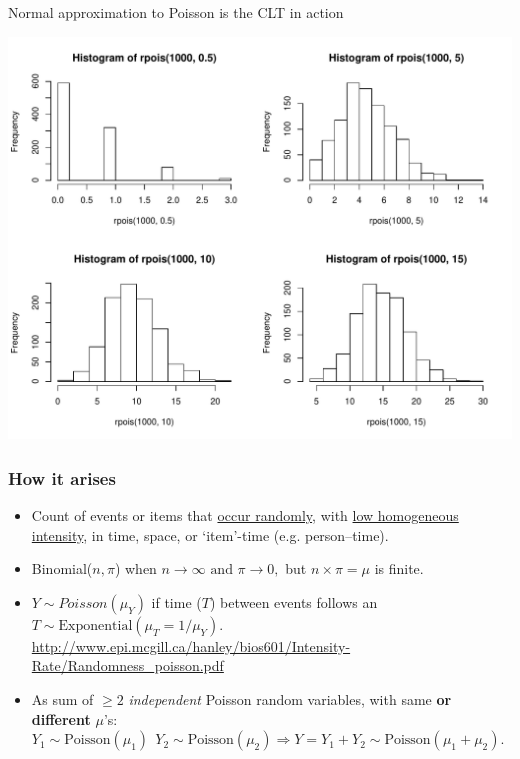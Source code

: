 \documentclass{beamer}\usepackage[]{graphicx}\usepackage[]{color}
\newenvironment{knitrout}{}{} %
\begin{document}
\begin{frame}[fragile]{Normal approximation to Poisson is the CLT in action}
\begin{knitrout}\scriptsize
{}\color{fgcolor}

{\centering \includegraphics[width=1\linewidth]{figure/unnamed-chunk-7-1} 

}



\end{knitrout}
\end{frame}	



\begin{frame}
\frametitle{How it arises}

\begin{itemize}
	\setlength\itemsep{1em}
   \item  Count of events or items that \underline{occur randomly}, with \underline{low homogeneous intensity}, in time, space, or `item'-time (e.g. person--time). \pause 
\item Binomial($n,\pi$) when $n \rightarrow \infty\textrm{ and } \pi \rightarrow 0,$ but $n \times \pi = \mu$ is finite.\pause 
\item $Y\sim Poisson(\mu_Y)$ if time ($T$) between events follows an $T \sim \textrm{Exponential}(\mu_{T} = 1/\mu_{Y}).$ 
{ \scriptsize   \url{http://www.epi.mcgill.ca/hanley/bios601/Intensity-Rate/Randomness_poisson.pdf}} \pause
\item  As sum of $\ge 2$  \textit{independent} Poisson random variables, 
with same \textbf{or different} $\mu$'s: \newline 
$Y_{1} \sim \textrm{Poisson}(\mu_{1}) \: \:   
Y_{2} \sim \textrm{Poisson}(\mu_{2}) \Rightarrow Y = Y_{1} + Y_{2} \sim \textrm{Poisson}(\mu_{1}+\mu_{2}).$
\end{itemize}
\end{frame}
\end{document}
